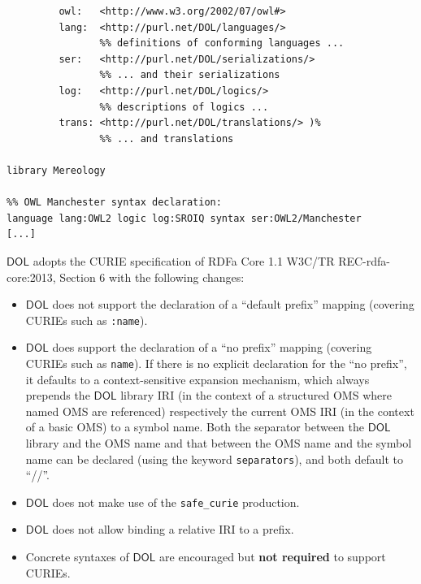 \documentclass[10pt,fleqn,final]{scrreprt}
\makeatletter
\newcommand{\cbe}[0]{\color{black}\xspace} %
\newcommand*\CommentAuthor{}
\renewcommand*\CommentAuthor{#1}}
\newcommand*\CommentDate{}
\renewcommand*\CommentDate{#1}}
\newcommand*\CommentId{}
\renewcommand*\CommentId{#1}}
\newcommand*\CommentType{}
\renewcommand*\CommentType{#1}}
\newcommand*{\SetCommentColorByType}[1]{%
\edef\localType{{#1}}%
\expandafter\ifstrequal\localType{q-aut}{\colorlet{CommentColor}{red}}{%
\expandafter\ifstrequal\localType{q-all}{\colorlet{CommentColor}{orange}}{%
\expandafter\ifstrequal\localType{todo}{\colorlet{CommentColor}{orange}}{%
\expandafter\ifstrequal\localType{fyi}{\colorlet{CommentColor}{lightgray}}{%
\colorlet{CommentColor}{yellow}}}}}}
\newcommand*{\SetCommentPrefixByType}[1]{%
\edef\localType{{#1}}%
\expandafter\@ifmtarg\localType{%
\edef\CommentPrefix{}%
}{%
\caseupper[q]{#1}%
\edef\CommentPrefix{\thestring: }%
}}
\newcommand*{\initComment}[1]{%
\setkeys{Comment}{#1}%
\SetCommentColorByType{\CommentType}%
\relax%
\SetCommentPrefixByType{\CommentType}%
\relax%
}
\newcommand*{\todonote}[2][]{%
\initComment{#1}%
\pdfcomment[author=\CommentAuthor,color=CommentColor,date=\CommentDate,id=\CommentId]{%
\CommentPrefix
#2}}
\renewcommand*{\todonote}[2][]{%
\initComment{#1}%
\ednote{\CommentPrefix #2}}
\newcommand*{\CLnote}[2][author=Christoph Lange]{%
\todonote[author=Christoph Lange,#1]{#2} 
}
\newcommand*{\syntax}[1]{\texttt{#1}}
\newcommand*{\notrequired}{\textbf{not required}\xspace}
\newcommand*{\DOL}{\ensuremath{\mathsf{DOL}}\xspace}
\newcommand{\nisref}[1]{#1}
\newenvironment{definitions}[0]{\medskip }{}
\makeatother
\begin{document}
\begin{definitions}
\begin{lstlisting}[basicstyle=\ttfamily,language=dolText,morekeywords={props,ObjectProperty,Class,DisjointUnionOf,SubClassOf,Characteristics,Transitive,Asymmetric,SubPropertyOf,DisjointClasses,EquivalentTo,inverse,only,forall,iff,if,or,exists,import},escapechar=@,mathescape]
%prefix( :      <http://www.example.org/mereology#>
         owl:   <http://www.w3.org/2002/07/owl#>
         lang:  <http://purl.net/DOL/languages/>
                %% definitions of conforming languages ...
         ser:   <http://purl.net/DOL/serializations/>
                %% ... and their serializations
         log:   <http://purl.net/DOL/logics/>
                %% descriptions of logics ...
         trans: <http://purl.net/DOL/translations/> )%
                %% ... and translations

library Mereology

%% OWL Manchester syntax declaration: 
language lang:OWL2 logic log:SROIQ syntax ser:OWL2/Manchester
[...]
\end{lstlisting}
\cbe

\DOL adopts the CURIE specification of RDFa Core 1.1 \nisref{W3C/TR REC-rdfa-core:2013, Section 6} with the following changes:
\begin{itemize}
\item \DOL does not support the declaration of a ``default prefix'' mapping %
(covering CURIEs such as \syntax{:name}).
\item \DOL does support the declaration  of a ``no prefix'' mapping (covering CURIEs such as 
\syntax{name}). If there is no explicit declaration for the ``no prefix'', it defaults to a 
context-sensitive expansion mechanism, which always prepends the \DOL library IRI (in the context of a 
structured OMS where named OMS are referenced) respectively the current OMS IRI (in the context of a basic
OMS) to a symbol name. Both the separator between the \DOL library and the OMS name and that between the 
OMS name and the symbol name can be declared (using the keyword \syntax{separators}), and both default to ``//''.

\item \DOL does not make use of the \syntax{safe\_curie} production.
\item \DOL does not allow binding a relative IRI to a prefix.
\item Concrete syntaxes of \DOL are encouraged but \notrequired to support CURIEs.
\end{itemize}


\end{definitions}
\end{document}
